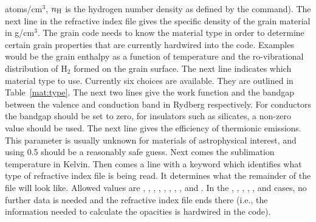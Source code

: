 atoms/cm$^3$, $n_{\rm H}$ is the hydrogen number density as defined by the
 command). The next line in the refractive index file gives
the specific density of the grain material in g/cm$^3$. The grain code needs
to know the material type in order to determine certain grain properties that
are currently hardwired into the code. Examples would be the grain enthalpy as
a function of temperature and the ro-vibrational distribution of H$_2$ formed
on the grain surface. The next line indicates which material type to use.
Currently six choices are available. They are outlined in
Table~\ref{mat:type}. The next two lines give the work function and the
bandgap between the valence and conduction band in Rydberg respectively. For
conductors the bandgap should be set to zero, for insulators such as
silicates, a non-zero value should be used. The next line gives the efficiency
of thermionic emissions. This parameter is usually unknown for materials of
astrophysical interest, and using 0.5 should be a reasonably safe guess. Next
comes the sublimation temperature in Kelvin. Then comes a line with a keyword
which identifies what type of refractive index file is being read. It
determines what the remainder of the file will look like. Allowed values are
, , , ,
, , , ,
and . In the , ,
, , , and 
cases, no further data is needed and the refractive index file ends there
(i.e., the information needed to calculate the opacities is hardwired in the
code).

